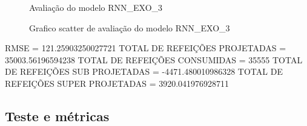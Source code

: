 \documentclass[	12pt, Times, openright, twoside, a4paper, english, brazil]{abntex2}
\begin{document}
                \begin{figure}[!ht]
                  \caption{Avaliação do modelo RNN\_EXO\_3 \label{fig:case1_rnn_exo_3_val} }
                \end{figure}
                \begin{figure}[!ht]
                  \caption{Grafico scatter de avaliação do modelo RNN\_EXO\_3 \label{fig:case1_rnn_exo_3_val_scatter} }
                \end{figure}

                RMSE = 121.25903250027721\newline
                TOTAL DE REFEIÇÕES PROJETADAS = 35003.56196594238\newline
                TOTAL DE REFEIÇÕES CONSUMIDAS = 35555\newline
                TOTAL DE REFEIÇÕES SUB PROJETADAS = -4471.480010986328\newline
                TOTAL DE REFEIÇÕES SUPER PROJETADAS = 3920.041976928711\newline
        \newpage
    	\subsection{Teste e métricas}
\end{document}
